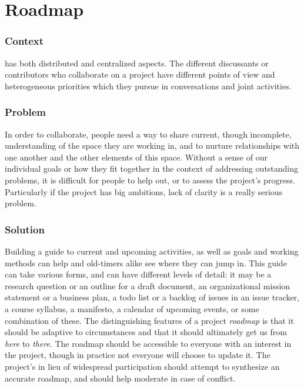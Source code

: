 

\section{Roadmap} \label{sec:Roadmap}



\subsubsection*{Context}  has both distributed and centralized aspects. The different discussants or contributors who collaborate on a project have different points of view and heterogeneous priorities which they pursue in conversations and joint activities.

\subsubsection*{Problem} In order to collaborate, people need a way to share current, though incomplete, understanding of the space they are working in, and to nurture relationships with one another and the other elements of this space.  Without a sense of our individual goals or how they fit together in the context of addressing outstanding problems, it is difficult for people to help out, or to assess the 
project's progress.  Particularly if the project has big ambitions, lack of clarity is a really serious problem.

\subsubsection*{Solution} Building a guide to current and upcoming activities, as well as goals and working methods can help  and old-timers alike see where they can jump in.  This guide can take various forms, and can have different levels of detail: it may be a research question or an outline for a draft document, an organizational mission statement or a business plan, a todo list or a backlog of issues in an issue tracker, a course syllabus, a manifesto, a calendar of upcoming events, or some combination of these.  The distinguishing features of a project \emph{roadmap} is that it should be adaptive to circumstances and that it should ultimately get us from \emph{here} to \emph{there}.  The roadmap should be accessible to everyone with an interest in the project, though in practice not everyone will choose to update it.  The project's  in lieu of widespread participation should attempt to synthesize an accurate roadmap, and should help moderate in case of conflict.


